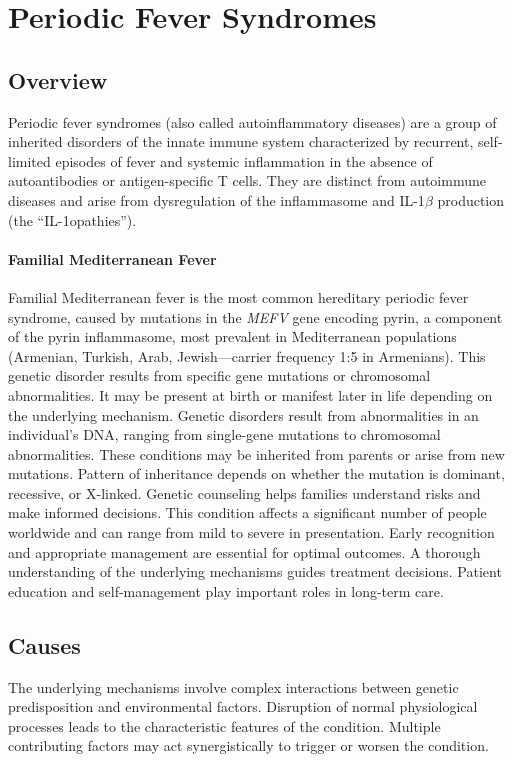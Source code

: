 \chapter{Periodic Fever Syndromes}
\label{sec:Periodic Fever Syndromes}

\section{Overview}
Periodic fever syndromes (also called autoinflammatory diseases) are a group of inherited disorders of the innate immune system characterized by recurrent, self-limited episodes of fever and systemic inflammation in the absence of autoantibodies or antigen-specific T cells. They are distinct from autoimmune diseases and arise from dysregulation of the inflammasome and IL-1$\beta$ production (the ``IL-1opathies'').

\subsubsection{Familial Mediterranean Fever}
Familial Mediterranean fever is the most common hereditary periodic fever syndrome, caused by mutations in the \textit{MEFV} gene encoding pyrin, a component of the pyrin inflammasome, most prevalent in Mediterranean populations (Armenian, Turkish, Arab, Jewish---carrier frequency 1:5 in Armenians). This genetic disorder results from specific gene mutations or chromosomal abnormalities. It may be present at birth or manifest later in life depending on the underlying mechanism. Genetic disorders result from abnormalities in an individual's DNA, ranging from single-gene mutations to chromosomal abnormalities. These conditions may be inherited from parents or arise from new mutations. Pattern of inheritance depends on whether the mutation is dominant, recessive, or X-linked. Genetic counseling helps families understand risks and make informed decisions. This condition affects a significant number of people worldwide and can range from mild to severe in presentation. Early recognition and appropriate management are essential for optimal outcomes. A thorough understanding of the underlying mechanisms guides treatment decisions. Patient education and self-management play important roles in long-term care.
\section{Causes}
The underlying mechanisms involve complex interactions between genetic predisposition and environmental factors. Disruption of normal physiological processes leads to the characteristic features of the condition. Multiple contributing factors may act synergistically to trigger or worsen the condition.
